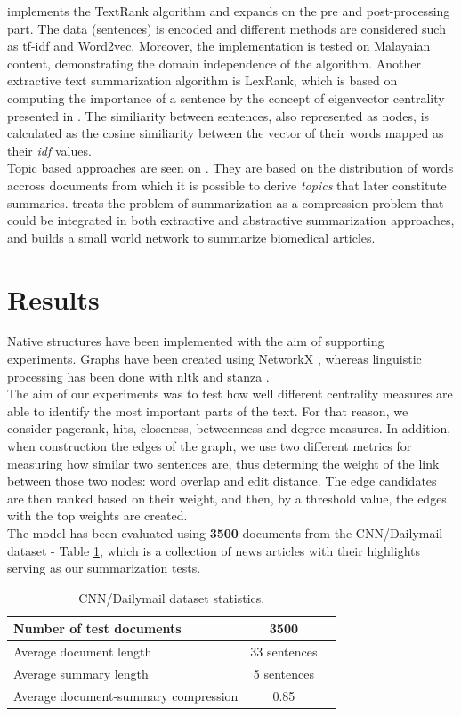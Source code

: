 \documentclass[9pt,twocolumn,twoside]{pnas-report}
\begin{document}
\cite{KM} implements the TextRank algorithm and expands on the pre and post-processing part. The data (sentences) is encoded and different methods are considered such as tf-idf and Word2vec. Moreover, the implementation is tested on Malayaian content, demonstrating the domain independence of the algorithm. 
Another extractive text summarization algorithm is LexRank, which is based on computing the importance of a sentence by the concept of eigenvector centrality presented in \cite{EG}. The similiarity between sentences, also represented as nodes, is calculated as the cosine similiarity between the vector of their words mapped as their \textit{idf} values. \\
Topic based approaches are seen on \cite{KARI, NG, RH}. They are based on the distribution of words accross documents from which it is possible to derive \textit{topics} that later constitute summaries.
\cite{KATJA} treats the problem of summarization as a compression problem that could be integrated in both extractive and abstractive summarization approaches, and \cite{MM} builds a small world network to summarize biomedical articles.

\section*{Results}
Native structures have been implemented with the aim of supporting experiments. Graphs have been created using NetworkX \cite{nx}, whereas linguistic processing has been done with nltk \cite{NLTK} and stanza \cite{qi2020stanza}. \\
The aim of our experiments was to test how well different centrality measures are able to identify the most important parts of the text. For that reason, we consider pagerank, hits, closeness, betweenness and degree measures. In addition, when construction the edges of the graph, we use two different metrics for measuring how similar two sentences are, thus determing the weight of the link between those two nodes: word overlap and edit distance. The edge candidates are then ranked based on their weight, and then, by a threshold value, the edges with the top weights are created. \\
The model has been evaluated using \textbf{3500} documents from the CNN/Dailymail \cite{DBLP:journals/corr/SeeLM17, hermann2015teaching} dataset - Table \ref{tbl:dataset}, which is a collection of news articles with their highlights serving as our summarization tests. 
\begin{table}[t]\centering%
	\caption{CNN/Dailymail dataset statistics.}
	\begin{tabular}{lcc}\toprule
	    Number of test documents & 3500\\
		\midrule
		Average document length & 33 sentences \\
		\midrule
		Average summary length & 5 sentences \\
		\midrule
		Average document-summary compression & 0.85\\ \bottomrule
	\end{tabular}
	\label{tbl:dataset}
\end{table}
\end{document}

